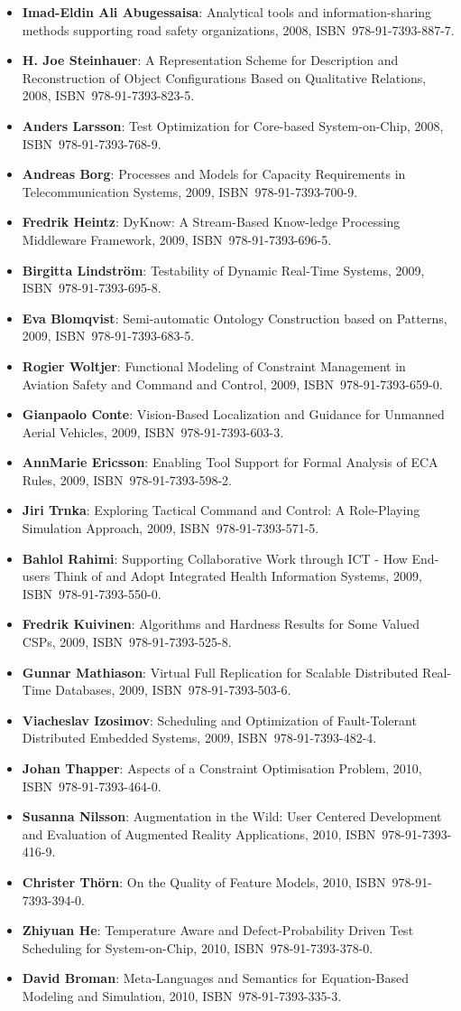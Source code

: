 \documentclass[a4paper,showtrims,twocolumn]{memoir}
\newenvironment{theses}{
  \begin{itemize}
    \setlength{\itemsep}{0.2em}
    \setlength{\parskip}{0em}
    \setlength{\parsep}{0em}
}{
  \end{itemize}
}
\newcommand{\thesis}[5]{\item[No. #1] \textbf{#2}: #3, #4, ISBN~#5.}
\begin{document}
\begin{theses}
    \thesis{1187}{Imad-Eldin Ali Abugessaisa}{Analytical tools and information-sharing methods supporting road safety organizations}{2008}{978-91-7393-887-7}
    \thesis{1204}{H. Joe Steinhauer}{A Representation Scheme for Description and Reconstruction of Object Configurations Based on Qualitative Relations}{2008}{978-91-7393-823-5}
    \thesis{1222}{Anders Larsson}{Test Optimization for Core-based System-on-Chip}{2008}{978-91-7393-768-9}
    \thesis{1238}{Andreas Borg}{Processes and Models for Capacity Requirements in Telecommunication Systems}{2009}{978-91-7393-700-9}
    \thesis{1240}{Fredrik Heintz}{DyKnow: A Stream-Based Know-ledge Processing Middleware Framework}{2009}{978-91-7393-696-5}
    \thesis{1241}{Birgitta Lindström}{Testability of Dynamic Real-Time Systems}{2009}{978-91-7393-695-8}
    \thesis{1244}{Eva Blomqvist}{Semi-automatic Ontology Construction based on Patterns}{2009}{978-91-7393-683-5}
    \thesis{1249}{Rogier Woltjer}{Functional Modeling of Constraint Management in Aviation Safety and Command and Control}{2009}{978-91-7393-659-0}
    \thesis{1260}{Gianpaolo Conte}{Vision-Based Localization and Guidance for Unmanned Aerial Vehicles}{2009}{978-91-7393-603-3}
    \thesis{1262}{AnnMarie Ericsson}{Enabling Tool Support for Formal Analysis of ECA Rules}{2009}{978-91-7393-598-2}
    \thesis{1266}{Jiri Trnka}{Exploring Tactical Command and Control: A Role-Playing Simulation Approach}{2009}{978-91-7393-571-5}
    \thesis{1268}{Bahlol Rahimi}{Supporting Collaborative Work through ICT - How End-users Think of and Adopt Integrated Health Information Systems}{2009}{978-91-7393-550-0}
    \thesis{1274}{Fredrik Kuivinen}{Algorithms and Hardness Results for Some Valued CSPs}{2009}{978-91-7393-525-8}
    \thesis{1281}{Gunnar Mathiason}{Virtual Full Replication for Scalable Distributed Real-Time Databases}{2009}{978-91-7393-503-6}
    \thesis{1290}{Viacheslav Izosimov}{Scheduling and Optimization of Fault-Tolerant Distributed Embedded Systems}{2009}{978-91-7393-482-4}
    \thesis{1294}{Johan Thapper}{Aspects of a Constraint Optimisation Problem}{2010}{978-91-7393-464-0}
    \thesis{1306}{Susanna Nilsson}{Augmentation in the Wild: User Centered Development and Evaluation of Augmented Reality Applications}{2010}{978-91-7393-416-9}
    \thesis{1313}{Christer Thörn}{On the Quality of Feature Models}{2010}{978-91-7393-394-0}
    \thesis{1321}{Zhiyuan He}{Temperature Aware and Defect-Probability Driven Test Scheduling for System-on-Chip}{2010}{978-91-7393-378-0}
    \thesis{1333}{David Broman}{Meta-Languages and Semantics for Equation-Based Modeling and Simulation}{2010}{978-91-7393-335-3}

\end{theses}
\end{document}
